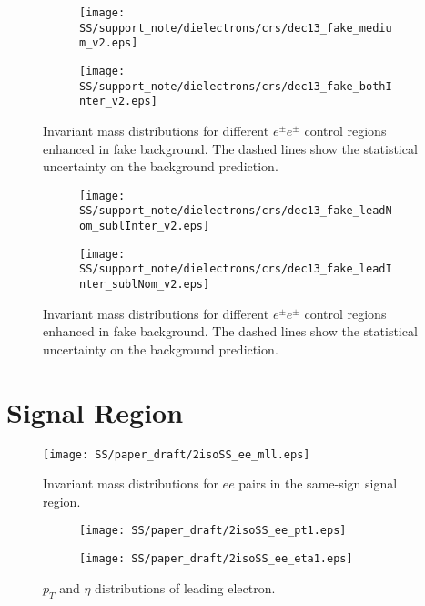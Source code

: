 \begin{figure}
\begin{subfigure}{.5\textwidth}
  \centering
  \texttt{[image: SS/support\_note/dielectrons/crs/dec13\_fake\_medium\_v2.eps]}
\end{subfigure}%
\begin{subfigure}{.5\textwidth}
  \centering
  \texttt{[image: SS/support\_note/dielectrons/crs/dec13\_fake\_bothInter\_v2.eps]}
\end{subfigure}
\caption{\toDo Invariant mass distributions for different $e^{\pm}e^{\pm}$ control regions enhanced in fake background. The dashed lines show the statistical uncertainty on the background prediction.}
  \label{fig:fakeCR_part1}
\end{figure}

\begin{figure}
\begin{subfigure}{.5\textwidth}
  \centering
  \texttt{[image: SS/support\_note/dielectrons/crs/dec13\_fake\_leadNom\_sublInter\_v2.eps]}
\end{subfigure}%
\begin{subfigure}{.5\textwidth}
  \centering
  \texttt{[image: SS/support\_note/dielectrons/crs/dec13\_fake\_leadInter\_sublNom\_v2.eps]}
\end{subfigure}
\caption{\toDo Invariant mass distributions for different $e^{\pm}e^{\pm}$ control regions enhanced in fake background. The dashed lines show the statistical uncertainty on the background prediction.}
  \label{fig:fakeCR_part2}
\end{figure}



\section{Signal Region}
\label{sec:ss_signalRegion}


\begin{figure}[h]
\begin{center}
\texttt{[image: SS/paper\_draft/2isoSS\_ee\_mll.eps]}
\caption{\toDo Invariant mass distributions for $ee$ pairs in the same-sign signal region.}
\label{fig:signal_mass}
\end{center}
\end{figure}


\begin{figure}
\begin{subfigure}{.5\textwidth}
  \centering
  \texttt{[image: SS/paper\_draft/2isoSS\_ee\_pt1.eps]}
\end{subfigure}%
\begin{subfigure}{.5\textwidth}
  \centering
  \texttt{[image: SS/paper\_draft/2isoSS\_ee\_eta1.eps]}
\end{subfigure}
\caption{\toDo $p_T$ and $\eta$ distributions of leading electron.}
  \label{fig:signal_kinematics}
\end{figure}

